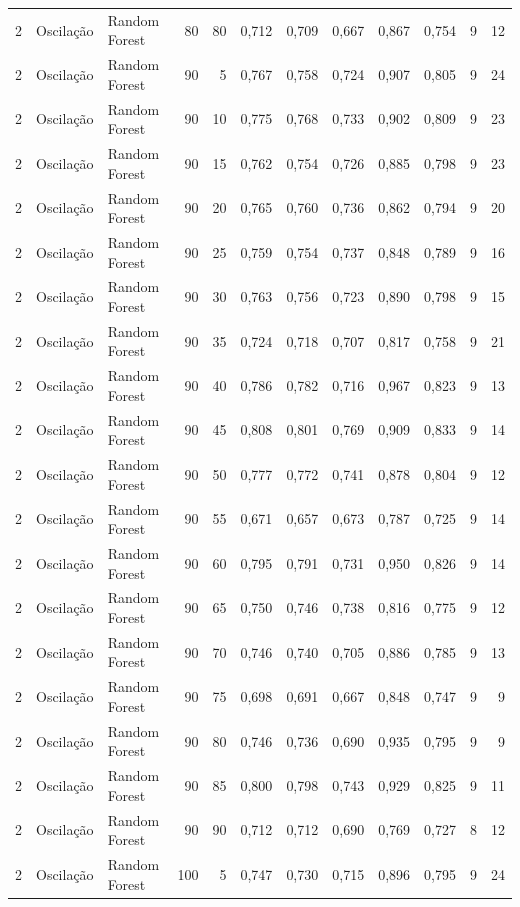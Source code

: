 \begin{longtable}{@{}rllrrrrrrrrr@{}}
2 & Oscilação & Random Forest & 80 & 80 & 0,712 & 0,709 & 0,667 & 0,867 & 0,754 & 9 & 12 \\
2 & Oscilação & Random Forest & 90 & 5 & 0,767 & 0,758 & 0,724 & 0,907 & 0,805 & 9 & 24 \\
2 & Oscilação & Random Forest & 90 & 10 & 0,775 & 0,768 & 0,733 & 0,902 & 0,809 & 9 & 23 \\
2 & Oscilação & Random Forest & 90 & 15 & 0,762 & 0,754 & 0,726 & 0,885 & 0,798 & 9 & 23 \\
2 & Oscilação & Random Forest & 90 & 20 & 0,765 & 0,760 & 0,736 & 0,862 & 0,794 & 9 & 20 \\
2 & Oscilação & Random Forest & 90 & 25 & 0,759 & 0,754 & 0,737 & 0,848 & 0,789 & 9 & 16 \\
2 & Oscilação & Random Forest & 90 & 30 & 0,763 & 0,756 & 0,723 & 0,890 & 0,798 & 9 & 15 \\
2 & Oscilação & Random Forest & 90 & 35 & 0,724 & 0,718 & 0,707 & 0,817 & 0,758 & 9 & 21 \\
2 & Oscilação & Random Forest & 90 & 40 & 0,786 & 0,782 & 0,716 & 0,967 & 0,823 & 9 & 13 \\
2 & Oscilação & Random Forest & 90 & 45 & 0,808 & 0,801 & 0,769 & 0,909 & 0,833 & 9 & 14 \\
2 & Oscilação & Random Forest & 90 & 50 & 0,777 & 0,772 & 0,741 & 0,878 & 0,804 & 9 & 12 \\
2 & Oscilação & Random Forest & 90 & 55 & 0,671 & 0,657 & 0,673 & 0,787 & 0,725 & 9 & 14 \\
2 & Oscilação & Random Forest & 90 & 60 & 0,795 & 0,791 & 0,731 & 0,950 & 0,826 & 9 & 14 \\
2 & Oscilação & Random Forest & 90 & 65 & 0,750 & 0,746 & 0,738 & 0,816 & 0,775 & 9 & 12 \\
2 & Oscilação & Random Forest & 90 & 70 & 0,746 & 0,740 & 0,705 & 0,886 & 0,785 & 9 & 13 \\
2 & Oscilação & Random Forest & 90 & 75 & 0,698 & 0,691 & 0,667 & 0,848 & 0,747 & 9 & 9 \\
2 & Oscilação & Random Forest & 90 & 80 & 0,746 & 0,736 & 0,690 & 0,935 & 0,795 & 9 & 9 \\
2 & Oscilação & Random Forest & 90 & 85 & 0,800 & 0,798 & 0,743 & 0,929 & 0,825 & 9 & 11 \\
2 & Oscilação & Random Forest & 90 & 90 & 0,712 & 0,712 & 0,690 & 0,769 & 0,727 & 8 & 12 \\
2 & Oscilação & Random Forest & 100 & 5 & 0,747 & 0,730 & 0,715 & 0,896 & 0,795 & 9 & 24 \\

\end{longtable}
